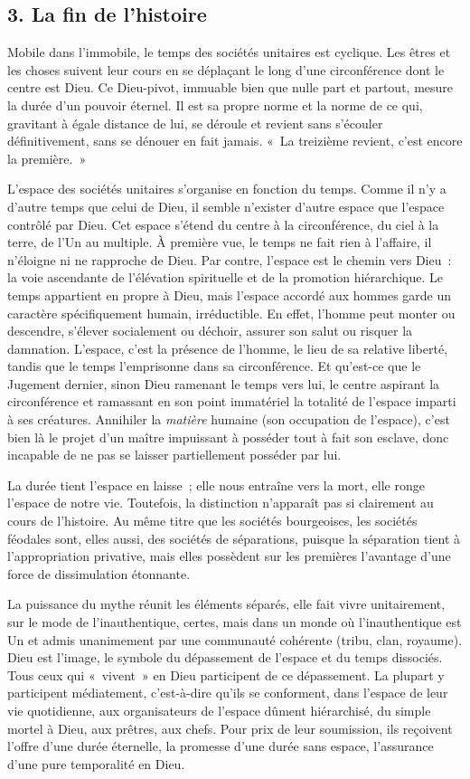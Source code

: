 \documentclass[french,twoside]{book} %
\begin{document}
\subsection[{3. La fin de l’histoire}]{\textsc{3.} La fin de l’histoire}
\noindent Mobile dans l’immobile, le temps des sociétés unitaires est cyclique. Les êtres et les choses suivent leur cours en se déplaçant le long d’une circonférence dont le centre est Dieu. Ce Dieu-pivot, immuable bien que nulle part et partout, mesure la durée d’un pouvoir éternel. Il est sa propre norme et la norme de ce qui, gravitant à égale distance de lui, se déroule et revient sans s’écouler définitivement, sans se dénouer en fait jamais. « La treizième revient, c’est encore la première. »\par
L’espace des sociétés unitaires s’organise en fonction du temps. Comme il n’y a d’autre temps que celui de Dieu, il semble n’exister d’autre espace que l’espace contrôlé par Dieu. Cet espace s’étend du centre à la circonférence, du ciel à la terre, de l’Un au multiple. À première vue, le temps ne fait rien à l’affaire, il n’éloigne ni ne rapproche de Dieu. Par contre, l’espace est le chemin vers Dieu : la voie ascendante de l’élévation spirituelle et de la promotion hiérarchique. Le temps appartient en propre à Dieu, mais l’espace accordé aux hommes garde un caractère spécifiquement humain, irréductible. En effet, l’homme peut monter ou descendre, s’élever socialement ou déchoir, assurer son salut ou risquer la damnation. L’espace, c’est la présence de l’homme, le lieu de sa relative liberté, tandis que le temps l’emprisonne dans sa circonférence. Et qu’est-ce que le Jugement dernier, sinon Dieu ramenant le temps vers lui, le centre aspirant la circonférence et ramassant en son point immatériel la totalité de l’espace imparti à ses créatures. Annihiler la \emph{matière} humaine (son occupation de l’espace), c’est bien là le projet d’un maître impuissant à posséder tout à fait son esclave, donc incapable de ne pas se laisser partiellement posséder par lui.\par
La durée tient l’espace en laisse ; elle nous entraîne vers la mort, elle ronge l’espace de notre vie. Toutefois, la distinction n’apparaît pas si clairement au cours de l’histoire. Au même titre que les sociétés bourgeoises, les sociétés féodales sont, elles aussi, des sociétés de séparations, puisque la séparation tient à l’appropriation privative, mais elles possèdent sur les premières l’avantage d’une force de dissimulation étonnante.\par
La puissance du mythe réunit les éléments séparés, elle fait vivre unitairement, sur le mode de l’inauthentique, certes, mais dans un monde où l’inauthentique est Un et admis unanimement par une communauté cohérente (tribu, clan, royaume). Dieu est l’image, le symbole du dépassement de l’espace et du temps dissociés. Tous ceux qui « vivent » en Dieu participent de ce dépassement. La plupart y participent médiatement, c’est-à-dire qu’ils se conforment, dans l’espace de leur vie quotidienne, aux organisateurs de l’espace dûment hiérarchisé, du simple mortel à Dieu, aux prêtres, aux chefs. Pour prix de leur soumission, ils reçoivent l’offre d’une durée éternelle, la promesse d’une durée sans espace, l’assurance d’une pure temporalité en Dieu.\par
\end{document}
